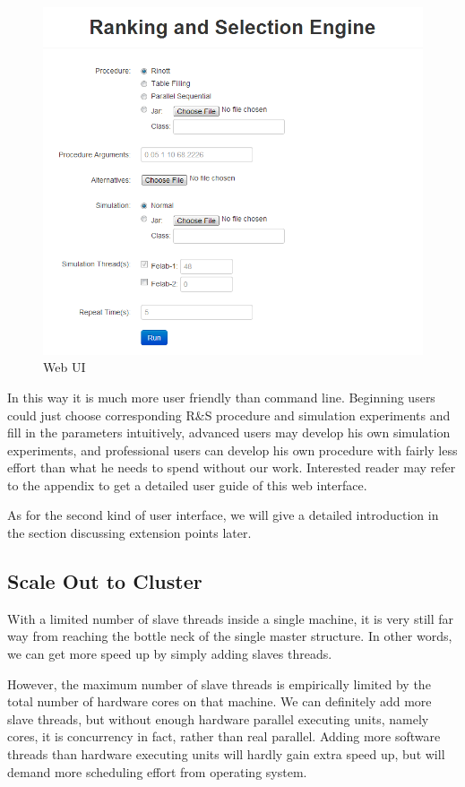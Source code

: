 \documentclass[12pt,a4paper]{report}
\begin{document}
\begin{figure}[ht]\label{web-ui}
\centering
\includegraphics[width=120mm]{rase_web.png}
\caption{Web UI}
\end{figure}

In this way it is much more user friendly than command line. Beginning users could just choose corresponding R\&S procedure and simulation experiments and fill in the parameters intuitively, advanced users may develop his own simulation experiments, and professional users can develop his own procedure with fairly less effort than what he needs to spend without our work. Interested reader may refer to the appendix to get a detailed user guide of this web interface.

As for the second kind of user interface, we will give a detailed introduction in the section discussing extension points later.

\subsection{Scale Out to Cluster}

With a limited number of slave threads inside a single machine, it is very still far way from reaching the bottle neck of the single master structure. In other words, we can get more speed up by simply adding slaves threads.

However, the maximum number of slave threads is empirically limited by the total number of hardware cores on that machine. We can definitely add more slave threads, but without enough hardware parallel executing units, namely cores, it is concurrency in fact, rather than real parallel. Adding more software threads than hardware executing units will hardly gain extra speed up, but will demand more scheduling effort from operating system.
\end{document}
